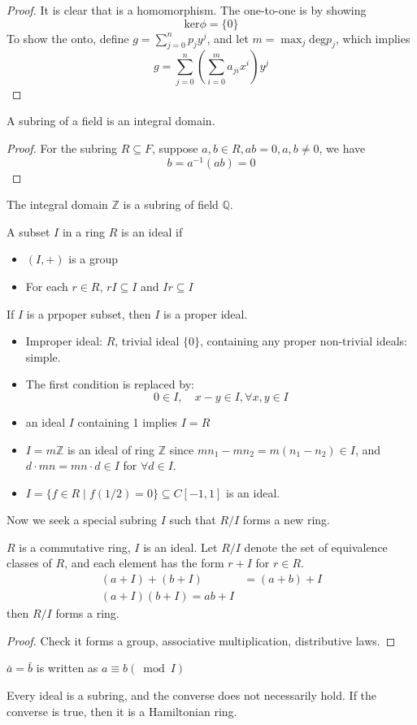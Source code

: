 \begin{proof}
It is clear that is a homomorphism. The one-to-one is by showing
\[
\mbox{ker}\phi=\{0\}
\]
To show the onto, define $g=\sum_{j=0}^np_jy^j$, and let $m=\max_{j}\mbox{deg}p_j$, which implies
\[
g=\sum_{j=0}^n(\sum_{i=0}^ma_{ji}x^i)y^j
\]
\end{proof}
\begin{proposition}
A subring of a field is an integral domain.
\end{proposition}
\begin{proof}
For the subring $R\subseteq F$, suppose $a,b\in R,ab=0,a,b\ne0$, we have
\[
b=a^{-1}(ab)=0
\]
\end{proof}
\begin{remark}
The integral domain $\mathbb{Z}$ is a subring of field $\mathbb{Q}$.
\end{remark}
\begin{definition}[Ideal]
A subset $I$ in a ring $R$ is an ideal if
\begin{itemize}
\item
$(I,+)$ is a group
\item
For each $r\in R$, $rI\subseteq I$ and $Ir\subseteq I$
\end{itemize}
If $I$ is a prpoper subset, then $I$ is a proper ideal.
\end{definition}
\begin{remark}
\begin{itemize}
\item
Improper ideal: $R$, trivial ideal $\{0\}$, containing any proper non-trivial ideals: simple.
\item
The first condition is replaced by:
\[
0\in I,\quad
x-y\in I,\forall x,y\in I
\]
\item
an ideal $I$ containing 1 implies $I=R$
\item
$I=m\mathbb{Z}$ is an ideal of ring $\mathbb{Z}$ since $mn_1-mn_2=m(n_1-n_2)\in I$, and $d\cdot mn=mn\cdot d\in I$ for $\forall d\in I$.
\item
$I=\{f\in R\mid f(1/2)=0\}\subseteq C[-1,1]$ is an ideal.
\end{itemize}
\end{remark}

Now we seek a special subring $I$ such that $R/I$ forms a new ring.
\begin{theorem}
$R$ is a commutative ring, $I$ is an ideal. Let $R/I$ denote the set of equivalence classes of $R$, and each element has the form $r+I$ for $r\in R$.
\begin{align*}
(a+I)+(b+I)&=(a+b)+I\\
(a+I)(b+I)=ab+I
\end{align*}
then $R/I$ forms a ring.
\end{theorem}
\begin{proof}
Check it forms a group, associative multiplication, distributive laws.
\end{proof}
\begin{remark}
$\bar a=\bar b$ is written as $a\equiv b(\bmod I)$
\end{remark}
Every ideal is a subring, and the converse does not necessarily hold. If the converse is true, then it is a Hamiltonian ring.

